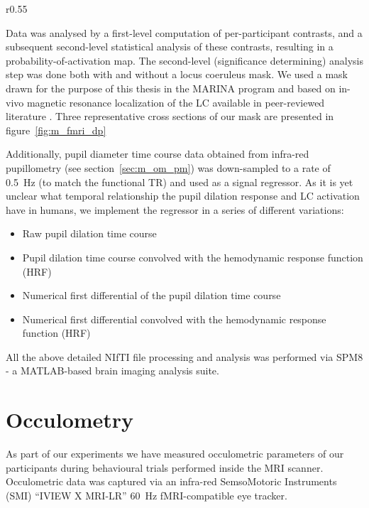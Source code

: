 	    \begin{wrapfigure}{r}{0.55\textwidth}
		\centering
		\caption{Mask for the LC based on MNI coordinates extracted from in-vivo MRI localization \citep{Keren2009}. The mask was smoothed and the dynamic range remapped to [-1;1].}
		\label{fig:m_fmri_dp}
		\vspace{-1.2cm}
	    \end{wrapfigure}
	    
	    Data was analysed by a first-level computation of per-participant contrasts, and a subsequent second-level statistical analysis of these contrasts, resulting in a probability-of-activation map.
	    The second-level (significance determining) analysis step was done both with and without a locus coeruleus mask.
	    We used a mask drawn for the purpose of this thesis in the MARINA program \citep{Walter2003} and based on in-vivo magnetic resonance localization of the LC available in peer-reviewed literature \citep{Keren2009}.
	    Three representative cross sections of our mask are presented in figure~\ref{fig:m_fmri_dp}
		
	    Additionally, pupil diameter time course data obtained from infra-red pupillometry (see section~\ref{sec:m_om_pm}) was down-sampled to a rate of \SI{0.5}{\hertz} (to match the functional TR) and used as a signal regressor.
	    As it is yet unclear what temporal relationship the pupil dilation response and LC activation have in humans, we implement the regressor in a series of different variations:
	    \begin{itemize}
		\item Raw pupil dilation time course
		\item Pupil dilation time course convolved with the hemodynamic response function (HRF)
		\item Numerical first differential of the pupil dilation time course
		\item Numerical first differential convolved with the hemodynamic response function (HRF)
	    \end{itemize}
	    
	    All the above detailed NIfTI file processing and analysis was performed via SPM8 - a MATLAB\textsuperscript{\small\textregistered}-based brain imaging analysis suite.
    \section{Occulometry}\label{sec:m_om}
	As part of our experiments we have measured occulometric parameters of our participants during behavioural trials performed inside the MRI scanner.
	Occulometric data was captured via an infra-red SemsoMotoric Instruments (SMI) “IVIEW X\textsuperscript{\small\texttrademark} MRI-LR” \SI{60}{\hertz} fMRI-compatible eye tracker.
